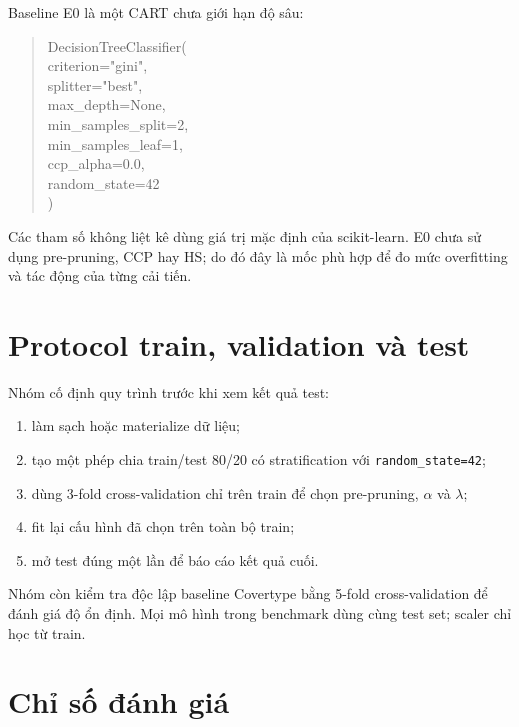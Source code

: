 Baseline E0 là một CART chưa giới hạn độ sâu:

\begin{quote}
\ttfamily\small
DecisionTreeClassifier(\\
\hspace*{1em}criterion="gini",\\
\hspace*{1em}splitter="best",\\
\hspace*{1em}max\_depth=None,\\
\hspace*{1em}min\_samples\_split=2,\\
\hspace*{1em}min\_samples\_leaf=1,\\
\hspace*{1em}ccp\_alpha=0.0,\\
\hspace*{1em}random\_state=42\\
)
\end{quote}

Các tham số không liệt kê dùng giá trị mặc định của scikit-learn. E0 chưa sử dụng pre-pruning, CCP hay HS; do đó đây là mốc phù hợp để đo mức overfitting và tác động của từng cải tiến.

\section{Protocol train, validation và test}

Nhóm cố định quy trình trước khi xem kết quả test:

\begin{enumerate}
    \item làm sạch hoặc materialize dữ liệu;
    \item tạo một phép chia train/test 80/20 có stratification với \texttt{random\_state=42};
    \item dùng 3-fold cross-validation chỉ trên train để chọn pre-pruning, $\alpha$ và $\lambda$;
    \item fit lại cấu hình đã chọn trên toàn bộ train;
    \item mở test đúng một lần để báo cáo kết quả cuối.
\end{enumerate}

Nhóm còn kiểm tra độc lập baseline Covertype bằng 5-fold cross-validation để đánh giá độ ổn định. Mọi mô hình trong benchmark dùng cùng test set; scaler chỉ học từ train.

\section{Chỉ số đánh giá}

